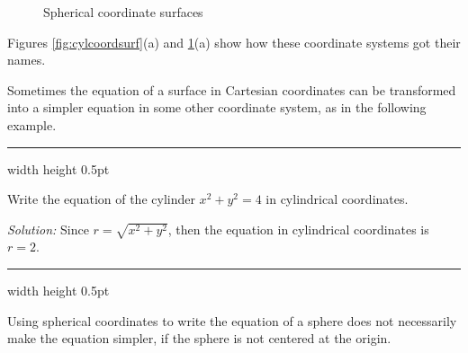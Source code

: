 \begin{figure}[h]
{}
 \caption[]{\quad Spherical coordinate surfaces}
 \label{fig:sphcoordsurf}
\end{figure}

Figures \ref{fig:cylcoordsurf}(a) and \ref{fig:sphcoordsurf}(a) show how these coordinate systems got their names.

Sometimes the equation of a surface in Cartesian coordinates can be transformed into a simpler equation in some other
coordinate system, as in the following example.

\vspace{2mm}
\hrule width \textwidth height 0.5pt
\begin{exmp}
 Write the equation of the cylinder $x^2 + y^2 = 4$ in cylindrical coordinates.\vspace{1mm}
 \par\noindent \emph{Solution:} Since $r = \sqrt{x^2 + y^2}$, then the equation in cylindrical
 coordinates is $r =2$.
\end{exmp}
\hrule width \textwidth height 0.5pt
\vspace{2mm}

Using spherical coordinates to write the equation of a sphere does not necessarily make the
equation simpler, if the sphere is not centered at the origin.

